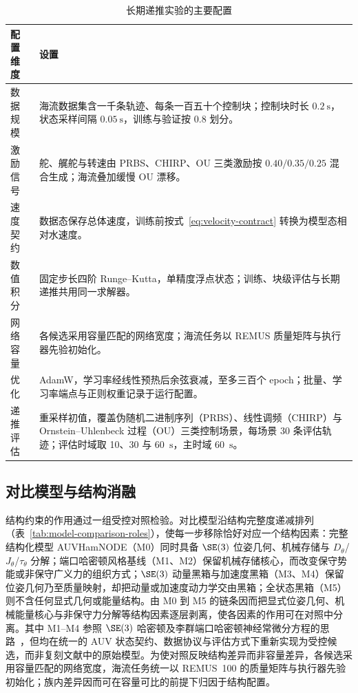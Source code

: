 \begin{table}[htbp]
  \centering
  \caption{长期递推实验的主要配置}
  \label{tab:experimental-config}
  \begin{tabularx}{\textwidth}{>{\raggedright\arraybackslash}p{}>{\raggedright\arraybackslash}X}
    \toprule
    配置维度 & 设置 \\
    \midrule
    数据规模 & 海流数据集含一千条轨迹、每条一百五十个控制块；控制块时长 \(0.2~\mathrm{s}\)，状态采样间隔 \(0.05~\mathrm{s}\)，训练与验证按 \(0.8\) 划分。 \\
    激励信号 & 舵、艉舵与转速由 PRBS、CHIRP、OU 三类激励按 \(0.40/0.35/0.25\) 混合生成；海流叠加缓慢 OU 漂移。 \\
    速度契约 & 数据态保存总体速度，训练前按式~\eqref{eq:velocity-contract} 转换为模型态相对水速度。 \\
    数值积分 & 固定步长四阶 Runge--Kutta，单精度浮点状态；训练、块级评估与长期递推共用同一求解器。 \\
    网络容量 & 各候选采用容量匹配的网络宽度；海流任务以 REMUS 质量矩阵与执行器先验初始化。 \\
    优化 & AdamW，学习率经线性预热后余弦衰减，至多三百个 epoch；批量、学习率端点与正则权重记录于运行配置。 \\
    递推评估 & 重采样初值，覆盖伪随机二进制序列（PRBS）、线性调频（CHIRP）与 Ornstein--Uhlenbeck 过程（OU）三类控制场景，每场景 30 条评估轨迹；评估时域取 10、30 与 60~\(\mathrm{s}\)，主时域 60~\(\mathrm{s}\)。 \\
    \bottomrule
  \end{tabularx}
\end{table}

\subsection{对比模型与结构消融}
\label{subsec:models-ablations}

结构约束的作用通过一组受控对照检验。对比模型沿结构完整度递减排列（表~\ref{tab:model-comparison-roles}），使每一步移除恰好对应一个结构因素：完整结构化模型 AUVHamNODE（M0）同时具备 \(\SE(3)\) 位姿几何、机械存储与 \(D_\theta\)/\(J_\theta\)/\(\tau_\theta\) 分解；端口哈密顿风格基线（M1、M2）保留机械存储核心，而改变保守势能或非保守广义力的组织方式；\(\SE(3)\) 动量黑箱与加速度黑箱（M3、M4）保留位姿几何乃至质量映射，却把动量或加速度动力学交由黑箱；全状态黑箱（M5）则不含任何显式几何或能量结构。由 M0 到 M5 的链条因而把显式位姿几何、机械能量核心与非保守力分解等结构因素逐层剥离，使各因素的作用可在对照中分离。其中 M1--M4 参照 \(\SE(3)\) 哈密顿及李群端口哈密顿神经常微分方程的思路~\citep{duong2021se3hamnode,duong2024liegroupphnode}，但均在统一的 AUV 状态契约、数据协议与评估方式下重新实现为受控候选，而非复刻文献中的原始模型。为使对照反映结构差异而非容量差异，各候选采用容量匹配的网络宽度，海流任务统一以 REMUS~100 的质量矩阵与执行器先验初始化；族内差异因而可在容量可比的前提下归因于结构配置。

